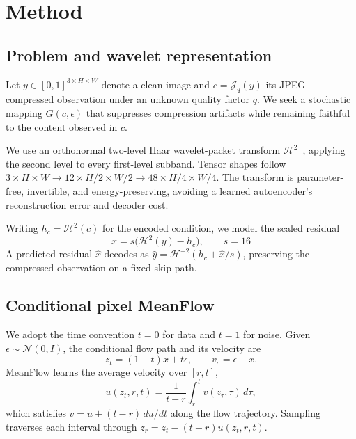 \documentclass[conference,letterpaper]{IEEEtran}
\begin{document}
\section{Method}
\label{sec:method}

\subsection{Problem and wavelet representation}

Let $y\in[0,1]^{3\times H\times W}$ denote a clean image and $c=\mathcal{J}_{q}(y)$ its JPEG-compressed observation under an unknown quality factor $q$.  We seek a stochastic mapping $G(c,\epsilon)$ that suppresses compression artifacts while remaining faithful to the content observed in $c$.

We use an orthonormal two-level Haar wavelet-packet transform $\mathcal{H}^{2}$~\cite{mallat1989wavelet}, applying the second level to every first-level subband. Tensor shapes follow $3\times H\times W\rightarrow12\times H/2\times W/2\rightarrow48\times H/4\times W/4$. The transform is parameter-free, invertible, and energy-preserving, avoiding a learned autoencoder's reconstruction error and decoder cost.

Writing $h_c=\mathcal{H}^{2}(c)$ for the encoded condition, we model the scaled residual
\begin{equation}
x=s\big(\mathcal{H}^{2}(y)-h_c\big),\qquad s=16
\label{eq:residual}
\end{equation}
A predicted residual $\hat{x}$ decodes as $\hat{y}=\mathcal{H}^{-2}(h_c+\hat{x}/s)$, preserving the compressed observation on a fixed skip path.

\subsection{Conditional pixel MeanFlow}

We adopt the time convention $t=0$ for data and $t=1$ for noise.  Given $\epsilon\sim\mathcal{N}(0,I)$, the conditional flow path and its velocity are
\begin{equation}
z_t=(1-t)x+t\epsilon, \qquad v_c=\epsilon-x.
\label{eq:path}
\end{equation}
MeanFlow learns the average velocity over $[r,t]$,
\begin{equation}
u(z_t,r,t)=\frac{1}{t-r}\int_r^t v(z_\tau,\tau)\,d\tau,
\end{equation}
which satisfies $v=u+(t-r)\,du/dt$ along the flow trajectory. Sampling traverses each interval through $z_r=z_t-(t-r)u(z_t,r,t)$.
\end{document}
